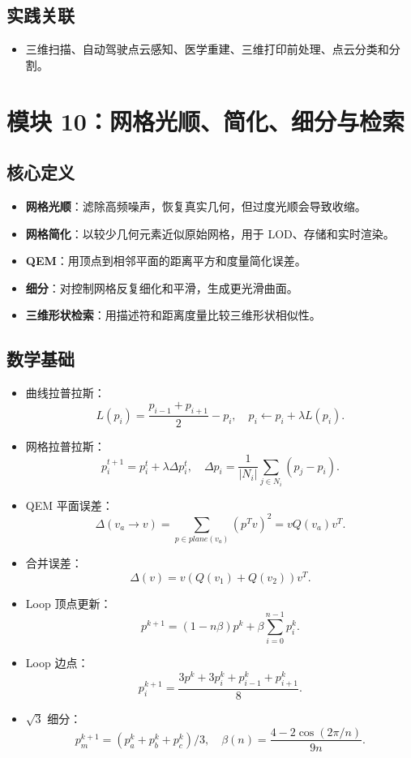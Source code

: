 \documentclass[UTF8,zihao=-4,scheme=chinese,fontset=fandol]{ctexart}
\newcommand{\key}[1]{\textbf{#1}}
\begin{document}
\subsection{实践关联}
\begin{itemize}
  \item 三维扫描、自动驾驶点云感知、医学重建、三维打印前处理、点云分类和分割。
\end{itemize}

\section{模块 10：网格光顺、简化、细分与检索}

\subsection{核心定义}
\begin{itemize}
  \item \key{网格光顺}：滤除高频噪声，恢复真实几何，但过度光顺会导致收缩。
  \item \key{网格简化}：以较少几何元素近似原始网格，用于 LOD、存储和实时渲染。
  \item \key{QEM}：用顶点到相邻平面的距离平方和度量简化误差。
  \item \key{细分}：对控制网格反复细化和平滑，生成更光滑曲面。
  \item \key{三维形状检索}：用描述符和距离度量比较三维形状相似性。
\end{itemize}

\subsection{数学基础}
\begin{itemize}
  \item 曲线拉普拉斯：
  \[
  L(p_i)=\frac{p_{i-1}+p_{i+1}}2-p_i,\quad p_i\leftarrow p_i+\lambda L(p_i).
  \]
  \item 网格拉普拉斯：
  \[
  p_i^{t+1}=p_i^t+\lambda\Delta p_i^t,\quad
  \Delta p_i=\frac1{|N_i|}\sum_{j\in N_i}(p_j-p_i).
  \]
  \item QEM 平面误差：
  \[
  \Delta(v_a\to v)=\sum_{p\in plane(v_a)}(p^Tv)^2=vQ(v_a)v^T.
  \]
  \item 合并误差：
  \[
  \Delta(v)=v(Q(v_1)+Q(v_2))v^T.
  \]
  \item Loop 顶点更新：
  \[
  p^{k+1}=(1-n\beta)p^k+\beta\sum_{i=0}^{n-1}p_i^k.
  \]
  \item Loop 边点：
  \[
  p_i^{k+1}=\frac{3p^k+3p_i^k+p_{i-1}^k+p_{i+1}^k}{8}.
  \]
  \item $\sqrt3$ 细分：
  \[
  p_m^{k+1}=(p_a^k+p_b^k+p_c^k)/3,\quad
  \beta(n)=\frac{4-2\cos(2\pi/n)}{9n}.
  \]
\end{itemize}
\end{document}
